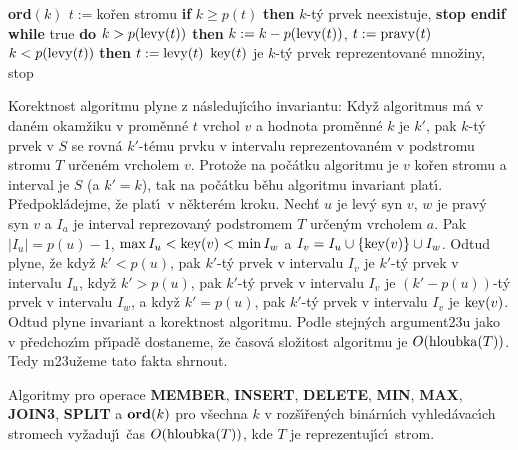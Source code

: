 {\bf ord$(k)$ \newline 
$t:=$}ko\v ren stromu \newline 
{\bf if} $k\ge p(t)$ {\bf then} $k$-t\'y prvek neexistuje, {\bf stop endif\newline 
while} true {\bf do}\newline 
\phantom{---}{\bf if} $k>p(\operatorname{levy}(t))$ {\bf then}\newline 
\phantom{------}$k:=k-p(\operatorname{levy}(t))$, $t:=\operatorname{pravy}(t)$\newline 
\phantom{---}{\bf else}\newline 
\phantom{------}{\bf if} $k<p(\operatorname{levy}(t))$ {\bf then}\newline 
\phantom{---------}$t:=\operatorname{levy}(t)$\newline 
\phantom{------}{\bf else}\newline 
\phantom{---------}$\operatorname{key}(t)$ je $k$-t\'y prvek reprezentovan\'e mno\v ziny, stop \newline 
\phantom{------}{\bf endif}\newline 
\phantom{---}{\bf endif\newline 
enddo}
\bigskip

\flushpar Korektnost algoritmu plyne z n\'asleduj\'\i c\'\i ho invariantu:  
Kdy\v z algoritmus m\'a v dan\'em okam\v ziku v prom\v enn\'e $t$ vrchol $
v$ 
a hodnota prom\v enn\'e $k$ je $k'$, pak $k$-t\'y prvek v $S$ se rovn\'a 
$k'$-t\'emu prvku v intervalu reprezentovan\'em v podstromu 
stromu $T$ ur\v cen\'em vrcholem $v$.  Proto\v ze na po\v c\'atku algoritmu 
je $v$ ko\v ren stromu a interval je $S$ (a $k'=k$), tak na po\v c\'atku 
b\v ehu algoritmu invariant plat\'\i.  P\v redpokl\'adejme, \v ze plat\'\i\ v 
n\v ekter\'em kroku.  Nech\v t $u$ je lev\'y syn $v$, $w$ je prav\'y syn $
v$ a 
$I_a$ je interval reprezovan\'y podstromem $T$ ur\v cen\'ym vrcholem $
a$.  
Pak $|I_u|=p(u)-1$, $\max I_u<\operatorname{key}(v)<\min I_w$ a 
$I_v=I_u\cup \{\operatorname{key}(v)\}\cup I_w$.  Odtud plyne, \v ze kdy\v z $k'
<p(u)$, pak 
$k'$-t\'y prvek v intervalu $I_v$ je $k'$-t\'y prvek v intervalu $
I_u$, kdy\v z 
$k'>p(u)$, pak $k'$-t\'y prvek v intervalu $I_v$ je $(k'-p(u))$-t\'y prvek 
v intervalu $I_w$, a kdy\v z $k'=p(u)$, pak $k'$-t\'y prvek v intervalu $
I_v$ 
je $\operatorname{key}(v)$.  Odtud plyne invariant a korektnost algoritmu.  
Podle stejn\'ych argument\accent23u jako v p\v redchoz\'\i m p\v r\'\i pad\v e 
dostaneme, \v ze \v casov\'a slo\v zitost algoritmu je $O(\operatorname{hloubka}
(T))$.  
Tedy m\accent23u\v zeme tato fakta shrnout.  

Algoritmy pro operace {\bf MEMBER}, {\bf INSERT}, {\bf DE\-LE\-TE}, {\bf MIN}, {\bf MAX}, 
{\bf JOIN3}, {\bf SPLIT} a $\bold o\bold r\bold d(k)$ pro v\v sechna $
k$ v roz\v s\'\i\v ren\'ych bin\'ar\-n\'\i ch 
vy\-hled\'avac\'\i ch stromech vy\v zaduj\'\i\ \v cas $O(\operatorname{hloubka}
(T))$, kde $T$ je 
reprezentuj\'\i c\'\i\ strom. 
\endproclaim


